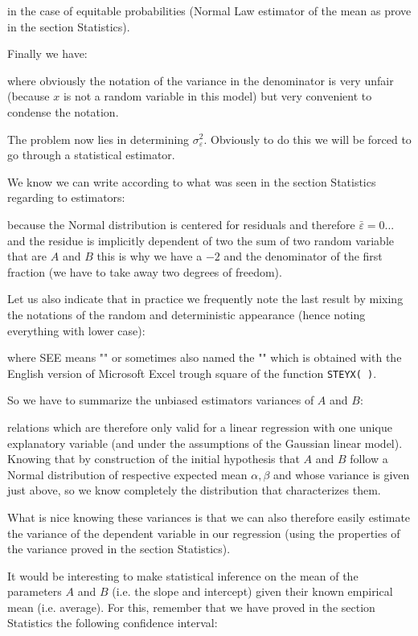 	in the case of equitable probabilities (Normal Law estimator of the mean as prove in the section Statistics).
	
	Finally we have:
	
	where obviously the notation of the variance in the denominator is very unfair (because $x$ is not a random variable in this model) but very convenient to condense the notation.
	
	The problem now lies in determining $\sigma_\varepsilon^2$. Obviously to do this we will be forced to go through a statistical estimator.
	
	We know we can write according to what was seen in the section Statistics regarding to estimators:
	
	because the Normal distribution is centered for residuals and therefore $\bar{\varepsilon}=0$... and the residue is implicitly dependent of two the sum of two random variable that are $A$ and $B$ this is why we have a $-2$ and the denominator of the first fraction (we have to take away two degrees of freedom).
	
	Let us also indicate that in practice we frequently note the last result by mixing the notations of the random and deterministic appearance (hence noting everything with lower case):
	
	where SEE means "" or sometimes also named  the "" which is obtained with the English version of Microsoft Excel trough square of the function \texttt{STEYX( )}.
	
	So we have to summarize the unbiased estimators variances of $A$ and $B$:
	
	relations which are therefore only valid for a linear regression with one unique explanatory variable (and under the assumptions of the Gaussian linear model). Knowing that by construction of the initial hypothesis that $A$ and $B$ follow a Normal distribution of respective expected mean $\alpha,\beta$ and whose variance is given just above, so we know completely the distribution that characterizes them.
	
	What is nice knowing these variances is that we can also therefore easily estimate the variance of the dependent variable in our regression (using the properties of the variance proved in the section Statistics).
	
	It would be interesting to make statistical inference on the mean of the parameters $A$ and $B$ (i.e. the slope and intercept) given their known empirical mean (i.e. average). For this, remember that we have proved in the section Statistics the following confidence interval:
	
